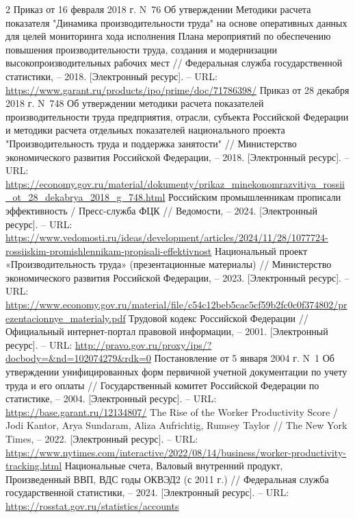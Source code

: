 \documentclass{article}
\begin{document}
\begin{thebibliography}{2}
 Приказ от 16 февраля 2018 г. N~76 Об утверждении Методики расчета показателя "Динамика производительности труда" на основе оперативных данных для целей мониторинга хода исполнения Плана мероприятий по обеспечению повышения производительности труда, создания и модернизации высокопроизводительных рабочих мест // Федеральная служба государственной статистики, – 2018. [Электронный ресурс]. – URL: \url{https://www.garant.ru/products/ipo/prime/doc/71786398/}
 Приказ от 28 декабря 2018 г. N~748 Об утверждении методики расчета показателей производительности труда предприятия, отрасли, субъекта Российской Федерации и методики расчета отдельных показателей национального проекта "Производительность труда и поддержка занятости" // Министерство экономического развития Российской Федерации, – 2018. [Электронный ресурс]. – URL: \url{https://economy.gov.ru/material/dokumenty/prikaz_minekonomrazvitiya_rossii_ot_28_dekabrya_2018_g_748.html}
 Российским промышленникам прописали эффективность / Пресс-служба ФЦК // Ведомости, – 2024. [Электронный ресурс]. – URL: \url{https://www.vedomosti.ru/ideas/development/articles/2024/11/28/1077724-rossiiskim-promishlennikam-propisali-effektivnost}
 Национальный проект «Производительность труда» (презентационные материалы) // Министерство экономического развития Российской Федерации, – 2023. [Электронный ресурс]. – URL: \url{https://www.economy.gov.ru/material/file/c54c12beb5cac5cf59b2fc0c0f374802/prezentacionnye_materialy.pdf}
 Трудовой кодекс Российской Федерации // Официальный интернет-портал правовой информации, – 2001. [Электронный ресурс]. – URL: \url{http://pravo.gov.ru/proxy/ips/?docbody=&nd=102074279&rdk=0}
 Постановление от 5 января 2004 г. N~1 Об утверждении унифицированных форм первичной учетной документации по учету труда и его оплаты // Государственный комитет Российской Федерации по статистике, – 2004. [Электронный ресурс]. – URL: \url{https://base.garant.ru/12134807/}
 The Rise of the Worker Productivity Score / Jodi Kantor, Arya Sundaram, Aliza Aufrichtig, Rumsey Taylor // The New York Times, – 2022. [Электронный ресурс]. – URL: \url{https://www.nytimes.com/interactive/2022/08/14/business/worker-productivity-tracking.html}
 Национальные счета, Валовый внутренний продукт, Произведенный ВВП, ВДС годы ОКВЭД2 (с 2011 г.) // Федеральная служба государственной статистики, – 2024. [Электронный ресурс]. – URL: \url{https://rosstat.gov.ru/statistics/accounts}

\end{thebibliography}
\end{document}
